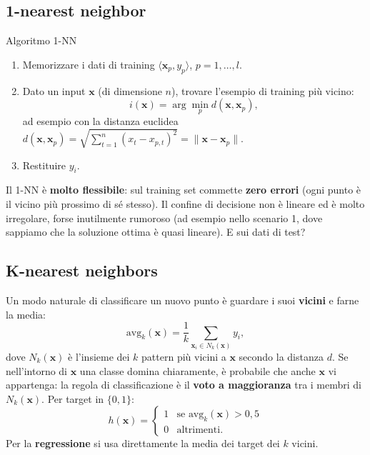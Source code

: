 \subsection{1-nearest neighbor}\label{nearest-neighbor}

\begin{boxdefinition}{Algoritmo 1-NN}

\begin{enumerate}
\def\labelenumi{\arabic{enumi}.}
\tightlist
\item
  Memorizzare i dati di training \(\langle \mathbf{x}_p, y_p\rangle\),
  \(p = 1,\dots,l\).
\item
  Dato un input \(\mathbf{x}\) (di dimensione \(n\)), trovare l'esempio
  di training più vicino: \[
  i(\mathbf{x}) = \arg\min_p d(\mathbf{x}, \mathbf{x}_p),
  \] ad esempio con la distanza euclidea
  \(d(\mathbf{x}, \mathbf{x}_p) = \sqrt{\sum_{t=1}^{n}(x_t - x_{p,t})^2} = \|\mathbf{x} - \mathbf{x}_p\|\).
\item
  Restituire \(y_i\).
\end{enumerate}

\end{boxdefinition}

Il 1-NN è \textbf{molto flessibile}: sul training set commette
\textbf{zero errori} (ogni punto è il vicino più prossimo di sé stesso).
Il confine di decisione non è lineare ed è molto irregolare, forse
inutilmente rumoroso (ad esempio nello scenario 1, dove sappiamo che la
soluzione ottima è quasi lineare). E sui dati di test?

\subsection{K-nearest neighbors}\label{k-nearest-neighbors-1}

Un modo naturale di classificare un nuovo punto è guardare i suoi
\textbf{vicini} e farne la media: \[
\text{avg}_k(\mathbf{x}) = \frac{1}{k}\sum_{\mathbf{x}_i \in N_k(\mathbf{x})} y_i,
\] dove \(N_k(\mathbf{x})\) è l'insieme dei \(k\) pattern più vicini a
\(\mathbf{x}\) secondo la distanza \(d\). Se nell'intorno di
\(\mathbf{x}\) una classe domina chiaramente, è probabile che anche
\(\mathbf{x}\) vi appartenga: la regola di classificazione è il
\textbf{voto a maggioranza} tra i membri di \(N_k(\mathbf{x})\). Per
target in \(\{0,1\}\): \[
h(\mathbf{x}) = \begin{cases} 1 & \text{se } \text{avg}_k(\mathbf{x}) > 0{,}5 \\ 0 & \text{altrimenti.} \end{cases}
\] Per la \textbf{regressione} si usa direttamente la media dei target
dei \(k\) vicini.

